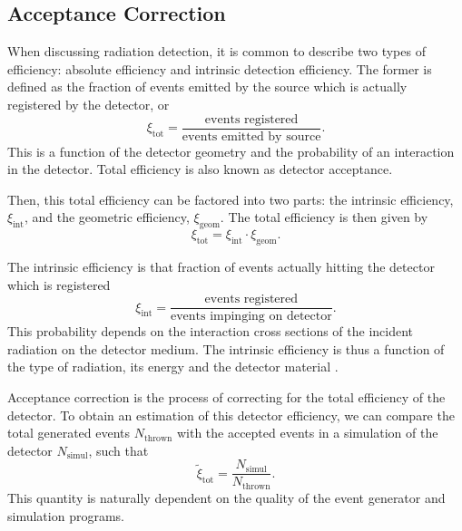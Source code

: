 \subsection{Acceptance Correction} \label{ssec::acceptance_correction}
    When discussing radiation detection, it is common to describe two types of efficiency: absolute efficiency and intrinsic detection efficiency.
    The former is defined as the fraction of events emitted by the source which is actually registered by the detector, or
    \begin{equation*}
        \xi_\text{tot} = \frac{\text{events registered}}{\text{events emitted by source}}.
    \end{equation*}
    This is a function of the detector geometry and the probability of an interaction in the detector.
    Total efficiency is also known as detector acceptance.

    Then, this total efficiency can be factored into two parts: the intrinsic efficiency, $\xi_{\text{int}}$, and the geometric efficiency, $\xi_{\text{geom}}$.
    The total efficiency is then given by
    \begin{equation*}
        \xi_\text{tot} = \xi_\text{int} \cdot \xi_\text{geom}.
    \end{equation*}

    The intrinsic efficiency is that fraction of events actually hitting the detector which is registered
    \begin{equation*}
        \xi_\text{int} = \frac{\text{events registered}}{\text{events impinging on detector}}.
    \end{equation*}
    This probability depends on the interaction cross sections of the incident radiation on the detector medium.
    The intrinsic efficiency is thus a function of the type of radiation, its energy and the detector material \cite{leo1987}.

    Acceptance correction is the process of correcting for the total efficiency of the detector.
    To obtain an estimation of this detector efficiency, we can compare the total generated events $N_\text{thrown}$ with the accepted events in a simulation of the detector $N_\text{simul}$, such that
    \begin{equation*}
        \tilde\xi_\text{tot} = \frac{N_\text{simul}}{N_\text{thrown}}.
    \end{equation*}
    This quantity is naturally dependent on the quality of the event generator and simulation programs.
    
